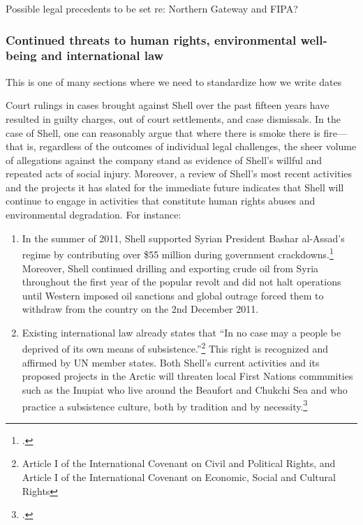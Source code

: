 \begin{vcom}
Possible legal precedents to be set re: Northern Gateway and FIPA?
\end{vcom}


	\subsubsection{Continued threats to human rights, environmental well-being and international law}
	
\begin{vcom}
This is one of many sections where we need to standardize how we write dates
\end{vcom}
	
Court rulings in cases brought against Shell over the past fifteen years have resulted in guilty charges, out of court settlements, and case dismissals. 
In the case of Shell, one can reasonably argue that where there is smoke there is fire—that is, regardless of the outcomes of individual legal challenges, the sheer volume of allegations against the company stand as evidence of Shell's willful and repeated acts of social injury. 
Moreover, a review of Shell's most recent activities and the projects it has slated for the immediate future indicates that Shell will continue to engage in activities that constitute human rights abuses and environmental degradation.
For instance:
\begin{enumerate}
	\item In the summer of 2011, Shell supported Syrian President Bashar al-Assad's regime by contributing over \$55 million during government crackdowns.\footcite[][]{Syria_2011} Moreover, Shell continued drilling and exporting crude oil from Syria throughout the first year of the popular revolt and did not halt operations until Western imposed oil sanctions and global outrage forced them to withdraw from the country on the 2nd December 2011.
	\item Existing international law already states that ``In no case may a people be deprived of its own means of subsistence.''\footnote{Article I of the International Covenant on Civil and Political Rights, and Article I of the International Covenant on Economic, Social and Cultural Rights} This right is recognized and affirmed by UN member states. Both Shell's current activities and its proposed projects in the Arctic will threaten local First Nations communities such as the Inupiat who live around the Beaufort and Chukchi Sea and who practice a subsistence culture, both by tradition and by necessity.\footcite[][p. 13]{RiskingRuin_2012}
\end{enumerate}

